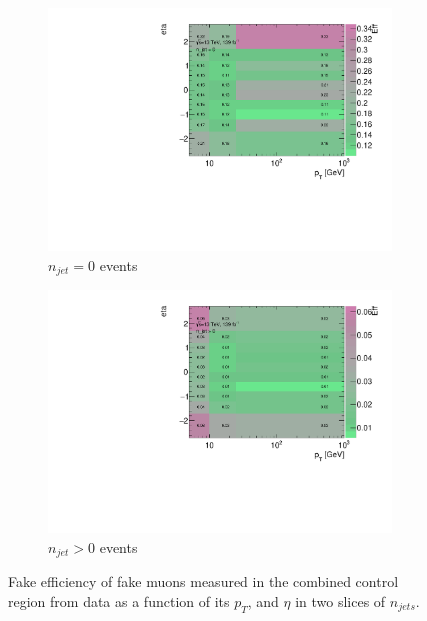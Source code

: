 \begin{figure}[!htb]
        \begin{center}
        \begin{subfigure}{.48\textwidth}
            \centering
            \includegraphics[width=.95\linewidth]{figures/Analysis/Background/njet0_FakeEfficiency3D_mu_pt_eta.pdf}
            \caption{$n_{jet}=0$ events \label{fig:FakeEff_3D_Muon_njet0}}
        \end{subfigure}
        \begin{subfigure}{.48\textwidth}
            \centering
            \includegraphics[width=.95\linewidth]{figures/Analysis/Background/njet1_FakeEfficiency3D_mu_pt_eta.pdf}
            \caption{$n_{jet}>0$ events \label{fig:FakeEff_3D_Muon_njet1}}
        \end{subfigure}
        \end{center}
    \caption{Fake efficiency of fake muons measured in the combined control region from data as a function of its $p_{T}$, and $\eta$ in two slices of $n_{jets}$. \label{fig:MuonFakeEff}}
\end{figure}

